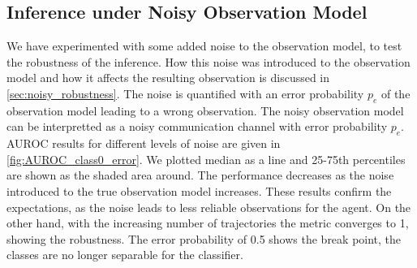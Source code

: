 \subsection{Inference under Noisy Observation Model}
We have experimented with some added noise to the observation model, to test the robustness of the inference. How this noise was introduced to the observation model and how it affects the resulting observation is discussed in \cref{sec:noisy_robustness}. The noise is quantified with an error probability $ p_e $ of the observation model leading to a wrong observation. The noisy observation model can be interpretted as a noisy communication channel with error probability $ p_e $. \\
AUROC results for different levels of noise are given in \autoref{fig:AUROC_class0_error}. We plotted median as a line and 25-75th percentiles are shown as the shaded area around. The performance decreases as the noise introduced to the true observation model increases. These results confirm the expectations, as the noise leads to less reliable observations for the agent. On the other hand, with the increasing number of trajectories the metric converges to 1, showing the robustness. The error probability of 0.5 shows the break point, the classes are no longer separable for the classifier. 
\pagebreak

